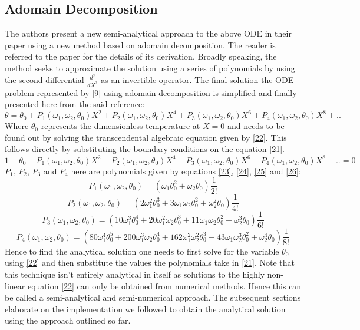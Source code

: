 \documentclass[12pt]{article}
\begin{document}
\subsection{Adomain Decomposition}
The authors present a new semi-analytical approach to the above ODE in their paper using a new method based on adomain decomposition. The reader is referred to the paper for the details of its derivation. Broadly speaking, the method seeks to approximate the solution using a series of polynomials by using the second-differential $\frac{d^2}{dX^2}$ as an invertible operator. The final solution the ODE problem represented by \eqref{9} using adomain decomposition is simplified and finally presented here from the said reference: 
\[
\theta = \theta_0 + P_1(\omega_1,\omega_2, \theta_0) X^2 + 
                    P_2(\omega_1,\omega_2, \theta_0) X^4 +
                    P_3(\omega_1,\omega_2, \theta_0) X^6 +
                    P_4(\omega_1,\omega_2, \theta_0) X^8+ ..  \tag{21} \label{21}
\]
Where $\theta_0$ represents the dimensionless temperature at $X=0$ and needs to be found out by solving the transcendental algebraic equation given by \eqref{22}. This follows directly by substituting the boundary conditions on the equation \eqref{21}.  
\[
1 - \theta_0  - P_1(\omega_1,\omega_2, \theta_0) X^2 - 
                    P_2(\omega_1,\omega_2, \theta_0) X^4 -
                    P_3(\omega_1,\omega_2, \theta_0) X^6 -
                    P_4(\omega_1,\omega_2, \theta_0) X^8+ .. = 0  \tag{22} \label{22}
\]
$P_1$, $P_2$, $P_3$ and $P_4$ here are polynomials given by equations \eqref{23}, \eqref{24}, \eqref{25} and \eqref{26}: 
\[
P_1(\omega_1,\omega_2,\theta_0) = (\omega_1 \theta_0^2 + \omega_2 \theta_0) \frac{1}{2!} \tag{23} \label{23}
\]
\[
P_2(\omega_1,\omega_2,\theta_0) = (2 \omega_1^2 \theta_0^3 + 3\omega_1 \omega_2 \theta_0^2 + \omega_2^2 \theta_0)\frac{1}{4!} \tag{24} \label{24}
\]
\[
P_3(\omega_1,\omega_2,\theta_0) = (10 \omega_1^3 \theta_0^4 + 20 \omega_1^2\omega_2 \theta_0^3 + 11 \omega_1 \omega_2 \theta_0^2 + \omega_2^3 \theta_0)\frac{1}{6!} \tag{25} \label{25}
\]
\[
P_4(\omega_1,\omega_2,\theta_0) = (80 \omega_1^4 \theta_0^5 + 200 \omega_1^3 \omega_2 \theta_0^4 + 162 \omega_1^2 \omega_2^2 \theta_0^3 + 43 \omega_1 \omega_2^3 \theta_0^2 + \omega_2^4 \theta_0)\frac{1}{8!}\tag{26} \label{26}
\]
Hence to find the analytical solution one needs to first solve for the variable $\theta_0$ using \eqref{22} and then substitute the values the polynomials take in \eqref{21}. Note that this technique isn't entirely analytical in itself as solutions to the highly non-linear equation \eqref{22} can only be obtained from numerical methods. Hence this can be called a semi-analytical and semi-numerical approach. The subsequent sections elaborate on the implementation we followed to obtain the analytical solution using the approach outlined so far. 
\end{document}
